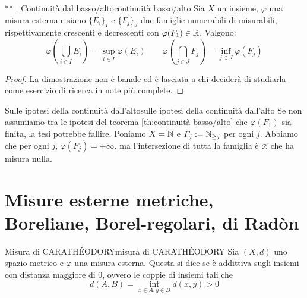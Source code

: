 \begin{theorem}{** | Continuità dal basso/alto}{continuità basso/alto}
    Sia $X$ un insieme, $\varphi$ una misura esterna e siano $\{E_i\}_I$ e $\{F_j\}_J$ due famiglie numerabili di misurabili, rispettivamente crescenti e decrescenti con $\varphi(F_1)\in \mathbb{R}$. Valgono:
    \[\varphi \left( \bigcup_{i \in I} E_i \right) = \sup_{i \in I} \varphi(E_i) \qquad \varphi \left( \bigcap_{j \in J} F_j \right) = \inf_{j \in J} \varphi(F_j)\]
    \begin{proof}
        La dimostrazione non è banale ed è lasciata a chi deciderà di studiarla come esercizio di ricerca in note più complete.
    \end{proof}
\end{theorem}
\begin{remark}{Sulle ipotesi della continuità dall'alto}{sulle ipotesi della continuità dall'alto}
    Se non assumiamo tra le ipotesi del teorema \ref{th:continuità basso/alto} che $\varphi(F_1)$ sia finita, la tesi potrebbe fallire. Poniamo $X = \mathbb{N}$ e $F_j := \mathbb{N}_{\ge j}$ per ogni $j$. Abbiamo che per ogni $j$, $\varphi(F_j) = +\infty$, ma l'intersezione di tutta la famiglia è $\varnothing$ che ha misura nulla.
\end{remark}

\section{Misure esterne metriche, Boreliane, Borel-regolari, di Radòn}

\begin{definition}{Misura di CARATHÉODORY}{misura di CARATHÉODORY}
    Sia $(X,d)$ uno spazio metrico e $\varphi$ una misura esterna. Questa si dice  se è addittiva sugli insiemi con distanza maggiore di $0$, ovvero le coppie di insiemi tali che
    \[d(A,B) = \inf_{x \in A, y \in B} d(x,y)> 0\]
\end{definition}

